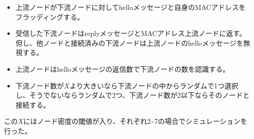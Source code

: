 \documentclass[a4paper, 9pt]{ltjsarticle}
\begin{document}
\begin{itemize}
  \item 上流ノードが下流ノードに対してhelloメッセージと自身のMACアドレスをフラッディングする。
  \item 受信した下流ノードはreplyメッセージとMACアドレス上流ノードに返す。但し、他ノードと接続済みの下流ノードは上流ノードのhelloメッセージを無視する。
  \item 上流ノードはhelloメッセージの返信数で下流ノードの数を認識する。
  \item 下流ノード数が$X$より大きいなら下流ノードの中からランダムで1つ選択し、そうでないならランダムで2つ、下流ノード数が2以下ならそのノードと接続する。
\end{itemize}

この$X$にはノード密度の閾値が入り、それぞれ2\textasciitilde7の場合でシミュレーションを行った。
\end{document}
